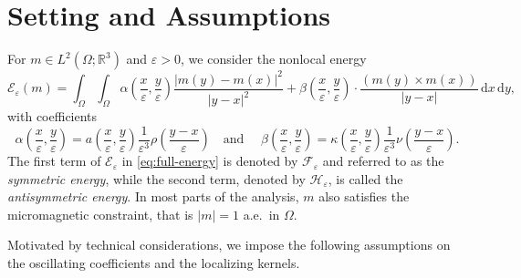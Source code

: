 \documentclass[reqno,11pt]{amsart}
\numberwithin{equation}{section}
\theoremstyle{thmlemcorr}
\numberwithin{theorem}{section}
\theoremstyle{thmlemcorr*}
\theoremstyle{defi}
\theoremstyle{remexample}
\theoremstyle{ass}
\newcommand{\R}{\mathbb{R}}
\newcommand{\Ecal}{\mathcal{E}}
\newcommand{\Fcal}{\mathcal{F}}
\newcommand{\Hcal}{\mathcal{H}}
\renewcommand{\epsilon}{\varepsilon}
\newcommand{\dd}{\,\mathrm{d}}
\newcommand{\1}{\mathds{1}}
\newcommand{\Om}{\Omega}
\newcommand{\veps}{\varepsilon}
\begin{document}
\section{Setting and Assumptions}\label{sec:setting}
For $m \in L^2(\Om; \R^3)$ and $\veps > 0$, we consider the nonlocal energy 
\begin{equation}\label{eq:full-energy}
    \Ecal_\epsilon(m) = \int_\Omega\int_\Omega \alpha\left(\frac{x}{\epsilon},\frac{y}{\epsilon}\right) \frac{|m(y)-m(x)|^2}{|y-x|^2} + \beta\left(\frac{x}{\epsilon},\frac{y}{\epsilon}\right)\cdot\frac{(m(y)\times m(x))}{|y-x|} \dd x\dd y,
\end{equation}
with coefficients
\begin{equation}\label{coefficients}
    \alpha\left(\frac{x}{\epsilon},\frac{y}{\epsilon}\right) = a\left(\frac{x}{\epsilon},\frac{y}{\epsilon}\right) \frac{1}{\epsilon^3}\rho\left(\frac{y-x}{\epsilon}\right) \quad \text{and } \quad 
\beta\left(\frac{x}{\epsilon},\frac{y}{\epsilon}\right) = \kappa\left(\frac{x}{\epsilon},\frac{y}{\epsilon}\right)  \frac{1}{\epsilon^3}\nu\left(\frac{y-x}{\epsilon}\right).
\end{equation}
The first term of $\Ecal_\epsilon$ in \eqref{eq:full-energy} is denoted by 
$\Fcal_\epsilon$ and referred to as the \textit{symmetric energy}, while the second term, denoted by 
$\Hcal_\epsilon$, is called the \textit{antisymmetric energy}. In most parts of the analysis, $m$ also satisfies the micromagnetic constraint, that is $|m| = 1$ a.e.\ in $\Om$.

Motivated by technical considerations, we impose the following assumptions on the oscillating coefficients and the localizing kernels.
\end{document}
